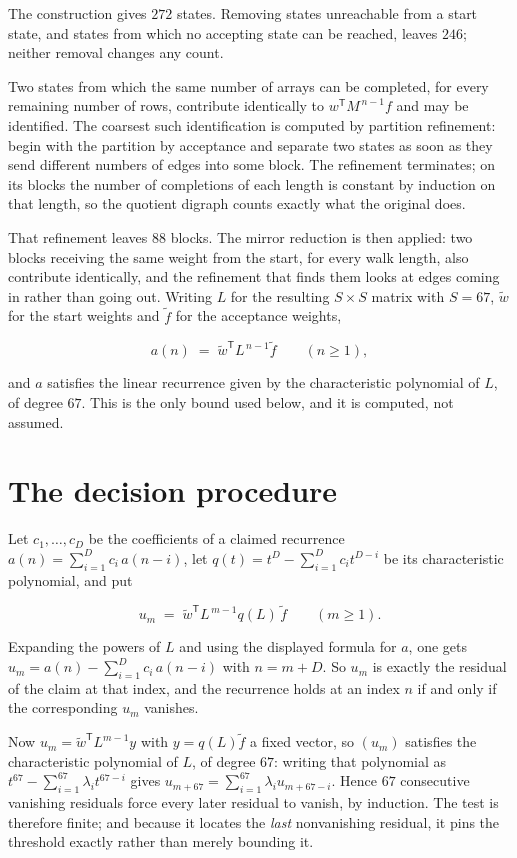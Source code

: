 \documentclass[11pt]{article}
\theoremstyle{definition}
\begin{document}
The construction gives $272$ states. Removing states unreachable from a start state, and states from which no accepting state can be reached, leaves $246$; neither removal changes any count.

Two states from which the same number of arrays can be completed, for every remaining number of rows, contribute identically to $w^{\mathsf T}M^{\,n-1}f$ and may be identified. The coarsest such identification is computed by partition refinement: begin with the partition by acceptance and separate two states as soon as they send different numbers of edges into some block. The refinement terminates; on its blocks the number of completions of each length is constant by induction on that length, so the quotient digraph counts exactly what the original does.

That refinement leaves $88$ blocks. The mirror reduction is then applied: two blocks receiving the same weight from the start, for every walk length, also contribute identically, and the refinement that finds them looks at edges coming in rather than going out. Writing $L$ for the resulting $S \times S$ matrix with $S = 67$, $\tilde w$ for the start weights and $\tilde f$ for the acceptance weights,

\[a(n) \;=\; \tilde w^{\mathsf T} L^{\,n-1} \tilde f \qquad (n \ge 1),\]

and $a$ satisfies the linear recurrence given by the characteristic polynomial of $L$, of degree $67$. This is the only bound used below, and it is computed, not assumed.

\section{The decision procedure}

Let $c_1,\dots,c_D$ be the coefficients of a claimed recurrence $a(n) = \sum_{i=1}^{D} c_i\,a(n-i)$, let $q(t) = t^{D} - \sum_{i=1}^{D} c_i t^{D-i}$ be its characteristic polynomial, and put

\[u_m \;=\; \tilde w^{\mathsf T} L^{\,m-1} q(L)\,\tilde f \qquad (m \ge 1).\]

Expanding the powers of $L$ and using the displayed formula for $a$, one gets $u_m = a(n) - \sum_{i=1}^{D} c_i\,a(n-i)$ with $n = m + D$. So $u_m$ is exactly the residual of the claim at that index, and the recurrence holds at an index $n$ if and only if the corresponding $u_m$ vanishes.

Now $u_m = \tilde w^{\mathsf T} L^{m-1} y$ with $y = q(L)\tilde f$ a fixed vector, so $(u_m)$ satisfies the characteristic polynomial of $L$, of degree $67$: writing that polynomial as $t^{67} - \sum_{i=1}^{67} \lambda_i t^{67-i}$ gives $u_{m+67} = \sum_{i=1}^{67} \lambda_i u_{m+67-i}$. Hence $67$ consecutive vanishing residuals force every later residual to vanish, by induction. The test is therefore finite; and because it locates the {\itshape last} nonvanishing residual, it pins the threshold exactly rather than merely bounding it.
\end{document}
